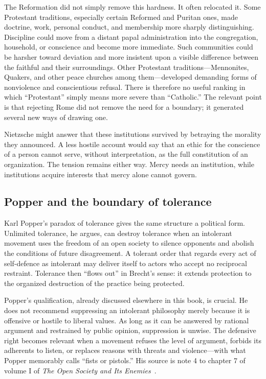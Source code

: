 ﻿\documentclass[12pt,a4paper]{book}
\begin{document}
The Reformation did not simply remove this hardness.  It often relocated it.
Some Protestant traditions, especially certain Reformed and Puritan ones,
made doctrine, work, personal conduct, and membership more sharply
distinguishing.  Discipline could move from a distant papal administration
into the congregation, household, or conscience and become more immediate.
Such communities could be harsher toward deviation and more insistent upon a
visible difference between the faithful and their surroundings.  Other
Protestant traditions---Mennonites, Quakers, and other peace churches among
them---developed demanding forms of nonviolence and conscientious refusal.
There is therefore no useful ranking in which ``Protestant'' simply means more
severe than ``Catholic.''  The relevant point is that rejecting Rome did not
remove the need for a boundary; it generated several new ways of drawing one.

Nietzsche might answer that these institutions survived by betraying the
morality they announced.  A less hostile account would say that an ethic for
the conscience of a person cannot serve, without interpretation, as the full
constitution of an organization.  The tension remains either way.  Mercy
needs an institution, while institutions acquire interests that mercy alone
cannot govern.

\subsection{Popper and the boundary of tolerance}

Karl Popper's paradox of tolerance gives the same structure a political form.
Unlimited tolerance, he argues, can destroy tolerance when an intolerant
movement uses the freedom of an open society to silence opponents and abolish
the conditions of future disagreement.  A tolerant order that regards every
act of self-defence as intolerant may deliver itself to actors who accept no
reciprocal restraint.  Tolerance then ``flows out'' in Brecht's sense: it
extends protection to the organized destruction of the practice being
protected.

Popper's qualification, already discussed elsewhere in this book, is crucial.
He does not recommend suppressing an intolerant philosophy merely because it
is offensive or hostile to liberal values.  As long as it can be answered by
rational argument and restrained by public opinion, suppression is unwise.
The defensive right becomes relevant when a movement refuses the level of
argument, forbids its adherents to listen, or replaces reasons with threats and
violence---with what Popper memorably calls ``fists or pistols.''  His source
is note 4 to chapter 7 of volume I of \emph{The Open Society and Its
Enemies}~\cite[vol.~I, ch.~7, note~4]{Popper-TOSAIE}.
\end{document}
